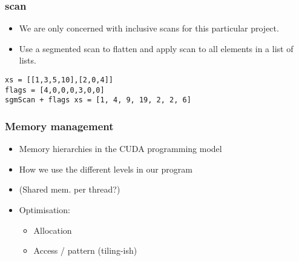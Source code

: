 \begin{frame}[fragile]
  \frametitle{scan}
%
\begin{itemize}
  \item We are only concerned with inclusive scans for this particular project.
  \item Use a segmented scan to flatten and apply scan to all elements in a list of lists.
\end{itemize}
%
%
\begin{lstlisting}
xs = [[1,3,5,10],[2,0,4]]
flags = [4,0,0,0,3,0,0]
sgmScan + flags xs = [1, 4, 9, 19, 2, 2, 6]
\end{lstlisting}
\end{frame}

\begin{frame}
  \frametitle{Memory management}
  \begin{itemize}
    \item Memory hierarchies in the CUDA programming model
    \item How we use the different levels in our program
    \item (Shared mem. per thread?)
    \item Optimisation:
      \begin{itemize}
        \item Allocation
        \item Access / pattern (tiling-ish)
      \end{itemize}
  \end{itemize}
\end{frame}
